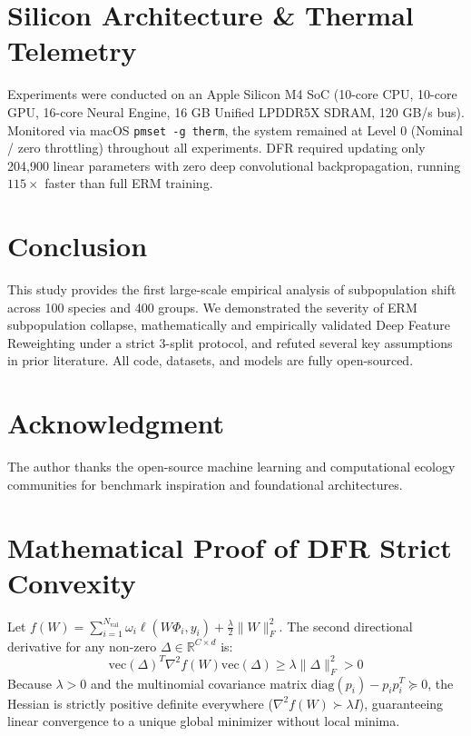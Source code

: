 \documentclass[10pt,journal,compsoc]{IEEEtran}
\begin{document}
\section{Silicon Architecture \& Thermal Telemetry}

Experiments were conducted on an Apple Silicon M4 SoC (10-core CPU, 10-core GPU, 16-core Neural Engine, 16 GB Unified LPDDR5X SDRAM, 120 GB/s bus). Monitored via macOS \texttt{pmset -g therm}, the system remained at Level 0 (Nominal / zero throttling) throughout all experiments. DFR required updating only 204,900 linear parameters with zero deep convolutional backpropagation, running $115\times$ faster than full ERM training.

\section{Conclusion}
This study provides the first large-scale empirical analysis of subpopulation shift across 100 species and 400 groups. We demonstrated the severity of ERM subpopulation collapse, mathematically and empirically validated Deep Feature Reweighting under a strict 3-split protocol, and refuted several key assumptions in prior literature. All code, datasets, and models are fully open-sourced.

\section*{Acknowledgment}
The author thanks the open-source machine learning and computational ecology communities for benchmark inspiration and foundational architectures.




\appendices

\section{Mathematical Proof of DFR Strict Convexity}
Let $f(W) = \sum_{i=1}^{N_{\text{val}}} \omega_i \ell(W \Phi_i, y_i) + \frac{\lambda}{2} \|W\|_F^2$. The second directional derivative for any non-zero $\Delta \in \mathbb{R}^{C \times d}$ is:
\begin{equation}
\text{vec}(\Delta)^T \nabla^2 f(W) \text{vec}(\Delta) \ge \lambda \|\Delta\|_F^2 > 0
\end{equation}
Because $\lambda > 0$ and the multinomial covariance matrix $\text{diag}(p_i) - p_i p_i^T \succeq 0$, the Hessian is strictly positive definite everywhere ($\nabla^2 f(W) \succ \lambda I$), guaranteeing linear convergence to a unique global minimizer without local minima.
\end{document}
